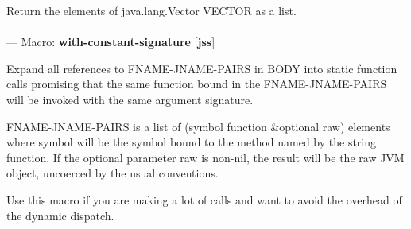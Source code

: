 \begin{adjustwidth}{5em}{5em}
Return the elements of java.lang.Vector VECTOR as a list.
\end{adjustwidth}

\paragraph{}
\label{JSS:WITH-CONSTANT-SIGNATURE}
--- Macro: \textbf{with-constant-signature} [\textbf{jss}] \textit{}

\begin{adjustwidth}{5em}{5em}
Expand all references to FNAME-JNAME-PAIRS in BODY into static function calls promising that the same function bound in the FNAME-JNAME-PAIRS will be invoked with the same argument signature.

FNAME-JNAME-PAIRS is a list of (symbol function \&optional raw)
elements where symbol will be the symbol bound to the method named by
the string function.  If the optional parameter raw is non-nil, the
result will be the raw JVM object, uncoerced by the usual conventions.

Use this macro if you are making a lot of calls and 
want to avoid the overhead of the dynamic dispatch.
\end{adjustwidth}

